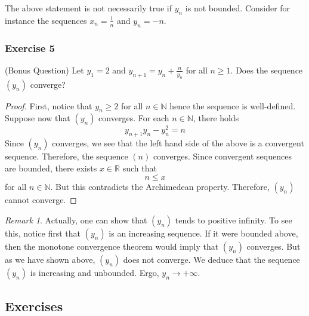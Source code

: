 \documentclass[12pt, reqno]{article}
\numberwithin{equation}{section}
\theoremstyle{definition}
\theoremstyle{remark}
\newtheorem{rem}{Remark}
\newcommand{\NN}{\mathbb{N}}
\newcommand{\RR}{\mathbb{R}}
\begin{document}
The above statement is not necessarily true if $y_n$ is not bounded. Consider for instance the sequences $x_n = \frac{1}{n}$ and $y_n = -n$.

\subsubsection*{Exercise 5} (Bonus Question) Let $y_1 = 2$ and $y_{n+1} = y_n +\frac{n}{y_n}$ for all $n\geq 1$. Does the sequence $(y_n)$ converge?

\begin{proof}
	First, notice that $y_n \geq 2$ for all $n\in\NN$ hence the sequence is well-defined. Suppose now that $(y_n)$ converges. For each $n\in\NN$, there holds
	\[
		y_{n+1}y_n - y_n^2 = n
	\]
	Since $(y_n)$ converges, we see that the left hand side of the above is a convergent sequence. Therefore, the sequence $(n)$ converges. Since convergent sequences are bounded, there exists $x \in \RR$ such that
	\[
		n \leq x
	\]
	for all $n\in \NN$. But this contradicts the Archimedean property. Therefore, $(y_n)$ cannot converge.
\end{proof}
\begin{rem}
	Actually, one can show that $(y_n)$ tends to positive infinity. To see this, notice first that $(y_n)$ is an increasing sequence. If it were bounded above, then the monotone convergence theorem would imply that $(y_n)$ converges. But as we have shown above, $(y_n)$ does not converge. We deduce that the sequence $(y_n)$ is increasing and unbounded. Ergo, $y_n \to +\infty$.
\end{rem}

\subsection*{Exercises}
\end{document}
